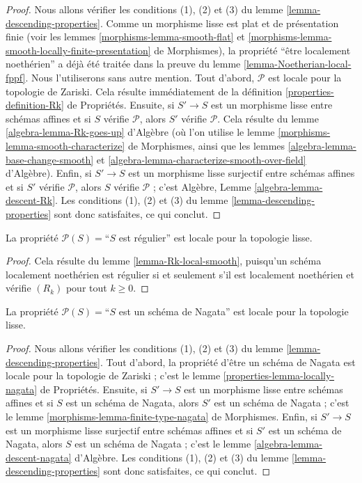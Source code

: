 \begin{proof}
Nous allons vérifier les conditions (1), (2) et (3) du lemme
\ref{lemma-descending-properties}. Comme un morphisme lisse est plat et de
présentation finie (voir les lemmes \ref{morphisms-lemma-smooth-flat} et
\ref{morphisms-lemma-smooth-locally-finite-presentation} de Morphismes), la propriété
``être localement noethérien'' a déjà été traitée dans la preuve du
lemme \ref{lemma-Noetherian-local-fppf}. Nous l'utiliserons sans autre
mention. Tout d'abord, $\mathcal{P}$ est locale pour la topologie de Zariski.
Cela résulte immédiatement de la définition \ref{properties-definition-Rk}
de Propriétés. Ensuite, si $S' \to S$ est un morphisme
lisse entre schémas affines et si $S$ vérifie $\mathcal{P}$, alors $S'$
vérifie $\mathcal{P}$. Cela résulte du lemme
\ref{algebra-lemma-Rk-goes-up} d'Algèbre (où l'on utilise le lemme
\ref{morphisms-lemma-smooth-characterize} de Morphismes, ainsi que les lemmes
\ref{algebra-lemma-base-change-smooth} et
\ref{algebra-lemma-characterize-smooth-over-field} d'Algèbre). Enfin, si $S' \to S$
est un morphisme lisse surjectif entre schémas affines et si $S'$ vérifie
$\mathcal{P}$, alors $S$ vérifie $\mathcal{P}$ ; c'est Algèbre, Lemme
\ref{algebra-lemma-descent-Rk}. Les conditions (1), (2) et (3) du
lemme \ref{lemma-descending-properties} sont donc satisfaites, ce qui conclut.
\end{proof}

\begin{lemma}
\label{lemma-regular-local-smooth}
La propriété $\mathcal{P}(S) =$``$S$ est régulier'' est locale pour la
topologie lisse.
\end{lemma}

\begin{proof}
Cela résulte du lemme \ref{lemma-Rk-local-smooth}, puisqu'un schéma localement
noethérien est régulier si et seulement s'il est localement noethérien et
vérifie $(R_k)$ pour tout $k \geq 0$.
\end{proof}

\begin{lemma}
\label{lemma-Nagata-local-smooth}
La propriété $\mathcal{P}(S) =$``$S$ est un schéma de Nagata'' est locale pour
la topologie lisse.
\end{lemma}

\begin{proof}
Nous allons vérifier les conditions (1), (2) et (3) du lemme
\ref{lemma-descending-properties}. Tout d'abord, la propriété d'être un schéma
de Nagata est locale pour la topologie de Zariski ; c'est le lemme
\ref{properties-lemma-locally-nagata} de Propriétés. Ensuite, si $S' \to S$ est un
morphisme lisse entre schémas affines et si $S$ est un schéma de Nagata,
alors $S'$ est un schéma de Nagata ; c'est le lemme
\ref{morphisms-lemma-finite-type-nagata} de Morphismes. Enfin, si $S' \to S$ est un
morphisme lisse surjectif entre schémas affines et si $S'$ est un schéma de
Nagata, alors $S$ est un schéma de Nagata ; c'est le lemme
\ref{algebra-lemma-descent-nagata} d'Algèbre. Les conditions (1), (2) et (3) du
lemme \ref{lemma-descending-properties} sont donc satisfaites, ce qui conclut.
\end{proof}





